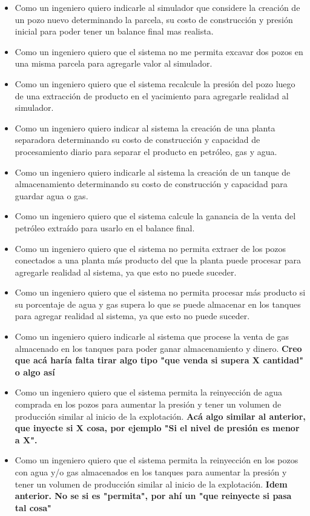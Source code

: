 \begin{itemize}
  \item Como un ingeniero quiero indicarle al simulador que considere la creación de un pozo nuevo determinando la parcela, su costo de construcción y presión inicial para poder tener un balance final mas realista.
  \item Como un ingeniero quiero que el sistema no me permita excavar dos pozos en una misma parcela para agregarle valor al simulador.
  \item Como un ingeniero quiero que el sistema recalcule la presión del pozo luego de una extracción de producto en el yacimiento para agregarle realidad al simulador.
  \item Como un ingeniero quiero indicar al sistema la creación de una planta separadora determinando su costo de construcción y capacidad de procesamiento diario para separar el producto en petróleo, gas y agua.
  \item Como un ingeniero quiero indicarle al sistema la creación de un tanque de almacenamiento determinando su costo de construcción y capacidad para guardar agua o gas.
  \item Como un ingeniero quiero que el sistema calcule la ganancia de la venta del petróleo extraído para usarlo en el balance final.
  \item Como un ingeniero quiero que el sistema no permita extraer de los pozos conectados a una planta más producto del que la planta puede procesar para agregarle realidad al sistema, ya que esto no puede suceder.
  \item Como un ingeniero quiero que el sistema no permita procesar más producto si su porcentaje de agua y gas supera lo que se puede almacenar en los tanques para agregar realidad al sistema, ya que esto no puede suceder.
  \item Como un ingeniero quiero indicarle al sistema que procese la venta de gas almacenado en los tanques para poder ganar almacenamiento y dinero. \textbf{Creo que acá haría falta tirar algo tipo "que venda si supera X cantidad" o algo así}
  \item Como un ingeniero quiero que el sistema permita la reinyección de agua comprada en los pozos para aumentar la presión y tener un volumen de producción similar al inicio de la explotación. \textbf{Acá algo similar al anterior, que inyecte si X cosa, por ejemplo "Si el nivel de presión es menor a X".}
  \item Como un ingeniero quiero que el sistema permita la reinyección en los pozos con agua y/o gas almacenados en los tanques para aumentar la presión y tener un volumen de producción similar al inicio de la explotación. \textbf{Idem anterior. No se si es "permita", por ahí un "que reinyecte si pasa tal cosa"}

\end{itemize}
